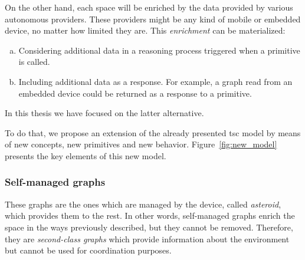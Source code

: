 On the other hand, each space will be enriched by the data provided by various autonomous providers.
These providers might be any kind of mobile or embedded device, no matter how limited they are.
This \emph{enrichment} can be materialized:
\begin{enumerate}[(a)]
  \item Considering additional data in a reasoning process triggered when a primitive is called.
  \item Including additional data as a response.
        For example, a graph read from an embedded device could be returned as a response to a primitive.
\end{enumerate}
In this thesis we have focused on the latter alternative.


To do that, we propose an extension of the already presented \ac{tsc} model by means of new concepts, new primitives and new behavior.
Figure~\ref{fig:new_model} presents the key elements of this new model.




\subsubsection{Self-managed graphs}

These graphs are the ones which are managed by the device, called \emph{asteroid}, which provides them to the rest.
In other words, self-managed graphs enrich the space in the ways previously described, but they cannot be removed.
Therefore, they are \emph{second-class graphs} which provide information about the environment but cannot be used for coordination purposes.

